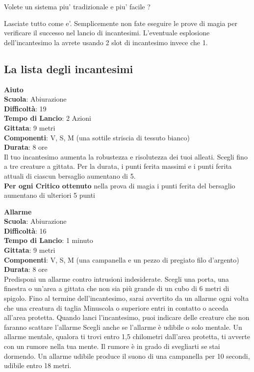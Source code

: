 \begin{multicols}{2}
	
\begin{narratore}
Volete un sistema piu' tradizionale e piu' facile ?

\medskip

Lasciate tutto come e'. Semplicemente non fate eseguire le prove di magia per verificare il successo nel lancio di incantesimi. L'eventuale esplosione dell'incantesimo la avrete usando 2 slot di incantesimo invece che 1.
\end{narratore}	



\subsection{La lista degli incantesimi}

\medskip\textbf{Aiuto}\\
\textbf{Scuola}: Abiurazione\\
\textbf{Difficoltà}: 19\\
\textbf{Tempo di Lancio}: 2 Azioni\\
\textbf{Gittata}: 9 metri\\
\textbf{Componenti}: V, S, M (una sottile striscia di tessuto bianco)\\
\textbf{Durata}: 8 ore\\
Il tuo incantesimo aumenta la robustezza e risolutezza dei tuoi alleati. Scegli fino a tre creature a gittata. Per la durata, i punti ferita massimi e i punti ferita attuali di ciascun bersaglio aumentano di 5.\\
\textbf{Per ogni Critico ottenuto} nella prova di magia i punti ferita del bersaglio aumentano di ulteriori 5 punti

\medskip\textbf{Allarme}\\
\textbf{Scuola}: Abiurazione\\
\textbf{Difficoltà}: 16\\
\textbf{Tempo di Lancio}: 1 minuto\\
\textbf{Gittata}: 9 metri\\
\textbf{Componenti}: V, S, M (una campanella e un pezzo di pregiato filo d'argento)\\
\textbf{Durata}: 8 ore\\
Predisponi un allarme contro intrusioni indesiderate. Scegli una porta, una finestra o un'area a gittata che non sia più grande di un cubo di 6 metri di spigolo. Fino al termine dell'incantesimo, sarai avvertito da un allarme ogni volta che una creatura di taglia Minuscola o superiore entri in contatto o acceda all'area protetta. Quando lanci l'incantesimo, puoi indicare delle creature che non faranno scattare l'allarme Scegli anche se l'allarme è udibile o solo mentale. Un allarme mentale, qualora ti trovi entro 1,5 chilometri dall'area protetta, ti avverte con un rumore nella tua mente. Il rumore è in grado di svegliarti se stai dormendo. Un allarme udibile produce il suono di una campanella per 10 secondi, udibile entro 18 metri.


\end{multicols}
